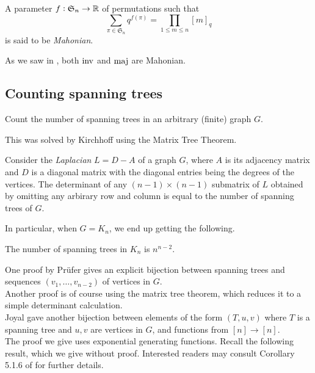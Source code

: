 	\begin{definition}
		A parameter $f : \mathfrak{S}_n \to \mathbb{R}$ of permutations such that
		\[ \sum_{\pi \in \mathfrak{S}_n} q^{f(\pi)} = \prod_{1 \le m \le n} [m]_q \]
		is said to be \emph{Mahonian}.
	\end{definition}

	As we saw in , both $\operatorname{inv}$ and $\operatorname{maj}$ are Mahonian.

\subsection{Counting spanning trees}

	\begin{problem*}
		Count the number of spanning trees in an arbitrary (finite) graph $G$.
	\end{problem*}

	This was solved by Kirchhoff using the Matrix Tree Theorem.
	
	\begin{ftheo}
		Consider the \emph{Laplacian} $L = D-A$ of a graph $G$, where $A$ is its adjacency matrix and $D$ is a diagonal matrix with the diagonal entries being the degrees of the vertices. The determinant of any $(n-1)\times(n-1)$ submatrix of $L$ obtained by omitting any arbirary row and column is equal to the number of spanning trees of $G$.
	\end{ftheo}


	In particular, when $G = K_n$, we end up getting the following.

	\begin{ftheo}
		\label{theo: cayleys theorem}
		The number of spanning trees in $K_n$ is $n^{n-2}$.
	\end{ftheo}
	One proof by Pr\"{u}fer gives an explicit bijection between spanning trees and sequences $(v_1,\ldots,v_{n-2})$ of vertices in $G$.\\
	Another proof is of course using the matrix tree theorem, which reduces it to a simple determinant calculation.\\
	Joyal gave another bijection between elements of the form $(T,u,v)$ where $T$ is a spanning tree and $u,v$ are vertices in $G$, and functions from $[n] \to [n]$.\\

	The proof we give uses exponential generating functions. Recall the following result, which we give without proof. Interested readers may consult Corollary 5.1.6 of \cite{ec2} for further details.

